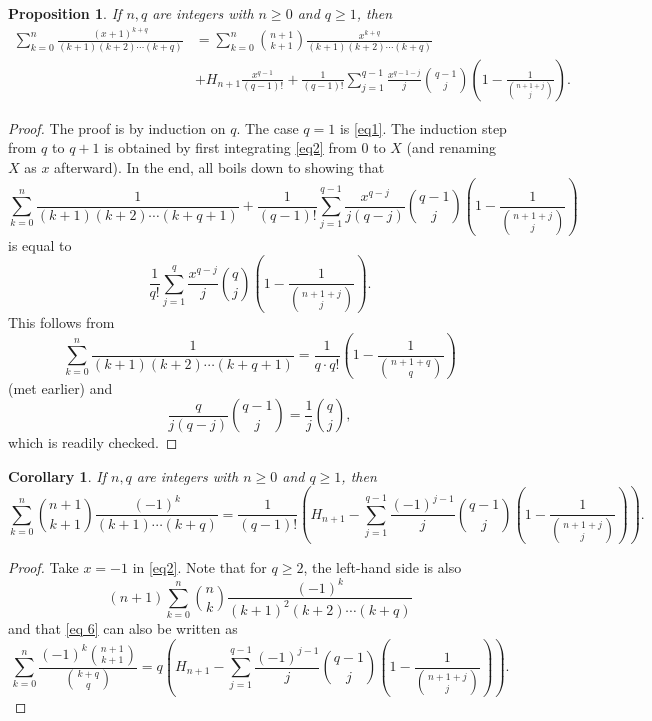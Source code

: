 \documentclass[11pt,reqno]{amsart}
\theoremstyle{plain}
\numberwithin{equation}{section}
\newtheorem{proposition}[thm]{Proposition}
\newtheorem{corollary}[thm]{Corollary}
\begin{document}
\begin{proposition}
If $n,q$ are integers with $n\ge 0$ and $q\ge 1$, then
\begin{align}\label{eq2}
\sum_{k=0}^n \frac{(x+1)^{k+q}}{(k+1)(k+2)\cdots (k+q)} &= \sum_{k=0}^n \binom{n+1}{k+1}\frac{x^{k+q}}{(k+1)(k+2)\cdots (k+q)} \nonumber \\
& + H_{n+1}\frac{x^{q-1}}{(q-1)!} + \frac{1}{(q-1)!}\sum_{j=1}^{q-1}\frac{x^{q-1-j}}{j}\binom{q-1}{j}\left(1-\frac{1}{\binom{n+1+j}{j}}\right).
\end{align}
\end{proposition}
\begin{proof}
The proof is by induction on $q$. The case $q=1$ is \eqref{eq1}. The induction step from $q$ to $q+1$ is obtained by first integrating \eqref{eq2} from $0$ to $X$ (and renaming $X$ as $x$ afterward). In the end, all boils down to showing that 
\[\sum_{k=0}^n\frac{1}{(k+1)(k+2)\cdots (k+q+1)}+\frac{1}{(q-1)!}\sum_{j=1}^{q-1}\frac{x^{q-j}}{j(q-j)}\binom{q-1}{j}\left(1-\frac{1}{\binom{n+1+j}{j}}\right)\]
is equal to
\[\frac{1}{q!}\sum_{j=1}^q\frac{x^{q-j}}{j}\binom{q}{j}\left(1-\frac{1}{\binom{n+1+j}{j}}\right).\]
This follows from 
$$\sum_{k=0}^n\frac{1}{(k+1)(k+2)\cdots (k+q+1)} = \frac{1}{q\cdot q!}\left(1-\frac{1}{\binom{n+1+q}{q}}\right)$$ 
(met earlier) and 
$$\frac{q}{j(q-j)} \binom{q-1}{j} = \frac{1}{j}\binom{q}{j},$$ 
which is readily checked.
\end{proof}

\begin{corollary}
If $n,q$ are integers with $n\ge 0$ and $q\ge 1$, then
\begin{equation}\label{eq 6}
\sum_{k=0}^n\binom{n+1}{k+1}\frac{(-1)^k}{(k+1)\cdots (k+q)}=\frac{1}{(q-1)!}\left(H_{n+1}-\sum_{j=1}^{q-1}\frac{(-1)^{j-1}}{j}\binom{q-1}{j}\left(1-\frac{1}{\binom{n+1+j}{j}}\right)\right).
\end{equation}
\end{corollary}
\begin{proof}
Take $x=-1$ in \eqref{eq2}. Note that for $q\ge 2$, the left-hand side is also
\[(n+1)\sum_{k=0}^n\binom{n}{k}\frac{(-1)^k}{(k+1)^2(k+2)\cdots (k+q)}\]
and that \eqref{eq 6} can also be written as
\[\sum_{k=0}^n \frac{(-1)^k\binom{n+1}{k+1}}{\binom{k+q}{q}} = q\left(H_{n+1}-\sum_{j=1}^{q-1}\frac{(-1)^{j-1}}{j}\binom{q-1}{j}\left(1-\frac{1}{\binom{n+1+j}{j}}\right)\right).\]
\end{proof}
\end{document}
